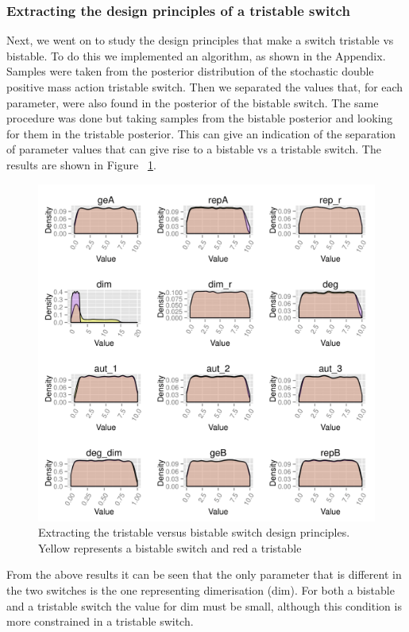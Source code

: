 \subsubsection{Extracting the design principles of a tristable switch}
Next, we went on to study the design principles that make a switch tristable vs bistable. To do this we implemented an algorithm, as shown in the Appendix. Samples were taken from the posterior distribution of the stochastic double positive mass action tristable switch. Then we separated the values that, for each parameter, were also found in the posterior of the bistable switch. The same procedure was done but taking samples from the bistable posterior and looking for them in the tristable posterior. This can give an indication of the separation of parameter values that can give rise to a bistable vs a tristable switch. The results are shown in Figure ~\ref{fig:design_pr_ma_dp}.

\begin{figure}[h!]
\begin{center}
\includegraphics[scale=0.2]{chapterStabilityFinder/mass_action_switches/bi_tri_same_priors/design_principles_pos_ab.png}
\caption{Extracting the tristable versus bistable switch design principles. Yellow represents a bistable switch and red a tristable}\label{fig:design_pr_ma_dp}
\end{center}
\end{figure}

From the above results it can be seen that the only parameter that is different in the two switches is the one representing dimerisation (dim). For both a bistable and a tristable switch the value for dim must be small, although this condition is more constrained in a tristable switch.
